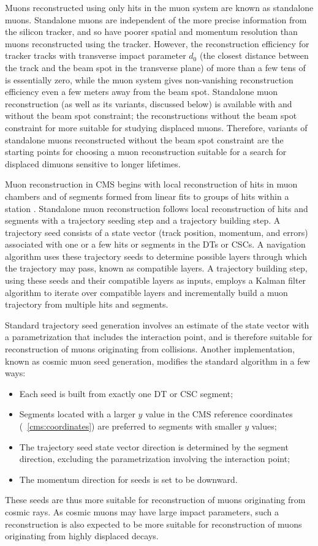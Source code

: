 Muons reconstructed using only hits in the muon system are known as standalone muons.
Standalone muons are independent of the more precise information from the silicon tracker, and so have poorer spatial and momentum resolution than muons reconstructed using the tracker.
However, the reconstruction efficiency for tracker tracks with transverse impact parameter $d_0$ (the closest distance between the track and the beam spot in the transverse plane) of more than a few tens of \cm is essentially zero, while the muon system gives non-vanishing reconstruction efficiency even a few meters away from the beam spot.
Standalone muon reconstruction (as well as its variants, discussed below) is available with and without the beam spot constraint; the reconstructions without the beam spot constraint for more suitable for studying displaced muons.
Therefore, variants of standalone muons reconstructed without the beam spot constraint are the starting points for choosing a muon reconstruction suitable for a search for displaced dimuons sensitive to longer lifetimes.

Muon reconstruction in CMS begins with local reconstruction of hits in muon chambers and of segments formed from linear fits to groups of hits within a station \cite{Liu2008}.
Standalone muon reconstruction follows local reconstruction of hits and segments with a trajectory seeding step and a trajectory building step.
A trajectory seed consists of a state vector (track position, momentum, and errors) associated with one or a few hits or segments in the DTs or CSCs.
A navigation algorithm uses these trajectory seeds to determine possible layers through which the trajectory may pass, known as compatible layers.
A trajectory building step, using these seeds and their compatible layers as inputs, employs a Kalman filter algorithm to iterate over compatible layers and incrementally build a muon trajectory from multiple hits and segments.

Standard trajectory seed generation involves an estimate of the state vector with a parametrization that includes the \pp interaction point, and is therefore suitable for reconstruction of muons originating from \pp collisions.
Another implementation, known as cosmic muon seed generation, modifies the standard algorithm in a few ways:
\begin{itemize}
  \item Each seed is built from exactly one DT or CSC segment;
  \item Segments located with a larger $y$ value in the CMS reference coordinates (\Sec~\ref{cms:coordinates}) are preferred to segments with smaller $y$ values;
  \item The trajectory seed state vector direction is determined by the segment direction, excluding the parametrization involving the interaction point;
  \item The momentum direction for seeds is set to be downward.
\end{itemize}
These seeds are thus more suitable for reconstruction of muons originating from cosmic rays.
As cosmic muons may have large impact parameters, such a reconstruction is also expected to be more suitable for reconstruction of muons originating from highly displaced decays.

